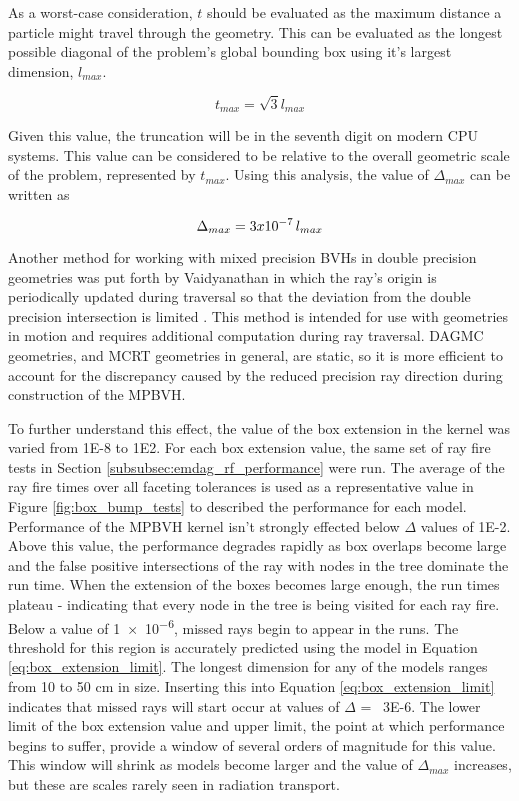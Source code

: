 As a worst-case consideration, $t$ should be evaluated as the maximum distance a
particle might travel through the geometry. This can be evaluated as the longest
possible diagonal of the problem's global bounding box using it's largest
dimension, $l_{max}$.

\begin{equation}
  t_{max} = \sqrt{3} l_{max}
\end{equation}

Given this value, the truncation will be in the seventh digit on modern
CPU systems. This value can be considered to be relative to the overall
geometric scale of the problem, represented by $t_{max}$. Using this analysis,
the value of $\Delta_{max}$ can be written as 

\begin{equation}
  \centering
  \Delta_{max} = 3 x 10^{-7} \, l_{max}
  \label{eq:box_extension_limit}
\end{equation}

Another method for working with mixed precision BVHs in double precision
geometries was put forth by Vaidyanathan in which the ray's origin is
periodically updated during traversal so that the deviation from the double
precision intersection is limited \cite{Vaidyanathan_2016}. This method is
intended for use with geometries in motion and requires additional computation
during ray traversal. DAGMC geometries, and MCRT geometries in
general, are static, so it is more efficient to account for the 
discrepancy caused by the reduced precision ray direction during
construction of 
the MPBVH.

To further understand this effect, the value of the box extension in the kernel
was varied from \num{1E-8} to \num{1E2}. For each box extension value, the same
set of ray fire tests in Section \ref{subsubsec:emdag_rf_performance} were
run. The average of the ray fire times over all faceting tolerances is used as a
representative value in Figure \ref{fig:box_bump_tests} to described the
performance for each model. Performance of the MPBVH kernel isn't strongly
effected below $\Delta$ values of \num{1E-2}. Above this value, the performance
degrades rapidly as box overlaps become large and the false positive
intersections of the ray with nodes in the tree dominate the run time. When the
extension of the boxes becomes large enough, the run times plateau - indicating
that every node in the tree is being visited for each ray fire. Below a value of
\num{1e-6}, missed rays begin to appear in the runs. The threshold for this
region is accurately predicted using the model in Equation
\eqref{eq:box_extension_limit}. The longest dimension for any of the models ranges
from 10 to 50 cm in size. Inserting this into Equation
\eqref{eq:box_extension_limit} indicates that missed rays will start occur at
values of $\Delta$ = ~\num{3E-6}. The lower limit of the box extension value and
upper limit, the point at which performance begins to suffer, provide a window
of several orders of magnitude for this value. This window will shrink as models
become larger and the value of $\Delta_{max}$ increases, but these are scales
rarely seen in radiation transport.

